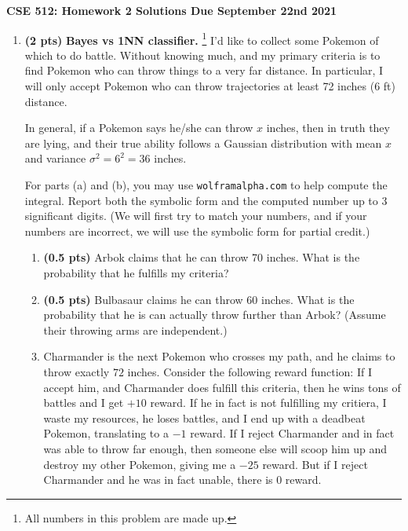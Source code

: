 \documentclass{article}
\newcommand{\mypagebreak}{\begin{center}
		\noindent\makebox[\linewidth]{\rule{7.5in}{1pt}}
	\end{center}}
\newcommand{\showpoints}[1]{\textbf{(#1)}}
\begin{document}
{\Large\textbf{CSE 512: Homework  2 Solutions \hfill
Due September 22nd 2021}}


\mypagebreak



\begin{enumerate}


\item \showpoints{2 pts} \textbf{Bayes vs 1NN classifier.} \footnote{All numbers in this problem are made up.}  I'd like to collect some Pokemon of which to do battle. Without knowing much, and my primary criteria is to find Pokemon who can throw things to a very far distance. In particular, I will only accept Pokemon who can throw trajectories at least   72 inches (6 ft) distance.

In general, if a Pokemon says he/she can throw $x$ inches,   then in truth they are lying, and their true ability follows a Gaussian distribution with mean $x$ and variance $\sigma^2 = 6^2 = 36$ inches.

For parts (a) and (b), you may use  \texttt{wolframalpha.com} to help compute the integral. Report both the symbolic form and the computed number up to 3 significant digits. (We will first try to match your numbers, and if your numbers are incorrect, we will use the symbolic form for partial credit.)

\begin{enumerate}
\item  \showpoints{0.5 pts}  Arbok claims that he can throw 70 inches. What is the probability that he fulfills my criteria? 



\item  \showpoints{0.5 pts}  Bulbasaur claims he can throw 60 inches. What is the probability that he is can actually throw further than Arbok? (Assume their throwing arms are independent.)





\item   Charmander is the next Pokemon who crosses my path, and he claims to throw exactly $72$ inches. Consider the following reward function: If I accept him, and Charmander does fulfill this criteria, then he wins tons of battles and I get $+10$ reward. If he in fact is not fulfilling my critiera, I waste my resources, he loses battles, and I end up with a deadbeat Pokemon, translating to a  $-1$ reward. If I reject Charmander and in fact was able to throw far enough, then someone else will scoop him up and destroy my other Pokemon, giving me a  $-25$ reward. But if I reject Charmander and he was in fact unable, there is $0$ reward. 


\end{enumerate}
\end{enumerate}
\end{document}
